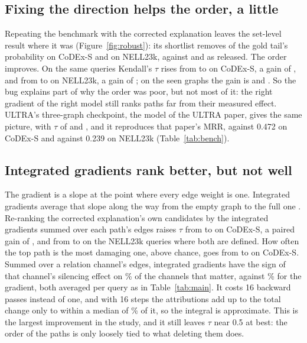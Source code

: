 \documentclass[10pt,twocolumn,letterpaper]{article}
\newcommand{\ci}[1]{{\scriptsize #1}}
\begin{document}
\subsection{Fixing the direction helps the order, a little}

Repeating the benchmark with the corrected explanation leaves the set-level
result where it was (Figure~\ref{fig:robust}): its shortlist removes
\cxFxCompFracOfBase{} of the gold tail's probability on CoDEx-S and
\nlFxCompFracOfBase{} on NELL23k, against \cxCompFracOfBase{} and
\nlCompFracOfBase{} as released. The order improves. On the same queries
Kendall's \(\tau\) rises from \cxFxPairedRel{} to \cxFxPairedFix{} on CoDEx-S,
a gain of \cxFxTauGain{} \ci{\cxFxTauGainCI}, and from \nlFxPairedRel{} to
\nlFxPairedFix{} on NELL23k, a gain of \nlFxTauGain{} \ci{\nlFxTauGainCI}; on
the seen graphs the gain is \wnFxTauGain{} and \fbFxTauGain. So the bug explains part of why the order was
poor, but not most of it: the right gradient of the right model still ranks
paths far from their measured effect. ULTRA's three-graph checkpoint, the
model of the ULTRA paper, gives the same picture, with \(\tau\) of
\cxTgKendallTauGradVsDrop{} and \nlTgKendallTauGradVsDrop, and it reproduces
that paper's MRR, \cxTgMrr{} against 0.472 on CoDEx-S and \nlTgMrr{} against
0.239 on NELL23k (Table~\ref{tab:bench}).

\subsection{Integrated gradients rank better, but not well}

The gradient is a slope at the point where every edge weight is one.
Integrated gradients average that slope along the way from the empty graph to
the full one \cite{ig}. Re-ranking the corrected explanation's own candidates
by the integrated gradients summed over each path's edges raises \(\tau\) from
\cxIgGradTau{} to \cxIgTau{} on CoDEx-S, a paired gain of \cxIgTauGain{}
\ci{\cxIgTauGainCI}, and from \nlIgGradTau{} to \nlIgTau{} on the \nlIgN{}
NELL23k queries where both are defined. How often the top path is the most
damaging one, above chance, goes from \cxIgGradTopGap{} to \cxIgTopGap{} on
CoDEx-S. Summed over a relation channel's edges, integrated gradients have
the sign of that channel's silencing effect on \cxIgChanSign\% of the
channels that matter, against \cxIgChanGradSign\% for the gradient, both
averaged per query as in Table~\ref{tab:main}. It costs 16 backward passes
instead of one, and with 16 steps the attributions add up to the total change
only to within a median of \cxIgCompGapRel\% of it, so the integral is
approximate. This is the largest improvement in the study, and it still leaves
\(\tau\) near 0.5 at best: the order of the paths is only loosely tied to what
deleting them does.
\end{document}
